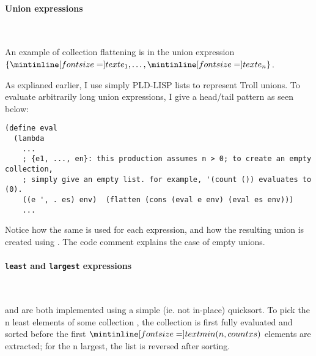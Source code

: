 \paragraph{Union expressions}~\smallskip

An example of collection flattening is in the union expression $\{\ms e_1,
\dots, \ms e_n\}$. 

As explianed earlier, I use simply PLD-LISP lists to represent Troll unions. To
evaluate arbitrarily long union expressions, I give  a head/tail
pattern as seen below:

\begin{verbatim}
(define eval
  (lambda
    ...
    ; {e1, ..., en}: this production assumes n > 0; to create an empty collection,
    ; simply give an empty list. for example, '(count ()) evaluates to (0).
    ((e ', . es) env)  (flatten (cons (eval e env) (eval es env)))
    ...
\end{verbatim}

Notice how the same  is used for each expression, and how the resulting
union is created using . The code comment explains the case of empty
unions.


%
%
%
%


\paragraph{\texttt{least} and \texttt{largest} expressions}~\smallskip

 and  are both implemented using a simple (ie. not
in-place) quicksort. To pick the \ms n least elements of some collection
, the collection is first fully evaluated and sorted before the first
$\ms{min(n, count xs)}$ elements are extracted; for the \ms n largest, the list
is reversed after sorting.



